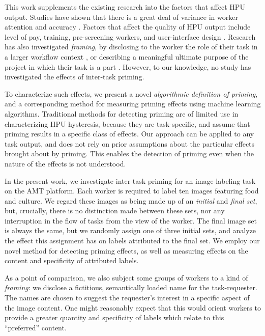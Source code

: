 \documentclass[a4paper]{report}
\begin{document}
This work supplements the existing research into the factors that affect HPU 
output.  Studies have shown that 
there is a great deal of variance in worker attention and 
accuracy \cite{kazai2013analysis}.
Factors that affect the quality of HPU 
output include level of pay\cite{kazai2013analysis}, 
training\cite{le2010ensuring}, pre-screening 
workers\cite{paolacci2010running}, and user-interface design
\cite{Finnerty2013}.  Research has also investigated \textit{framing}, 
by disclosing to the worker the role of
their task in a larger workflow context \cite{Kinnaird2012281}, 
or describing a meaningful ultimate purpose of the project in which their
task is a part \cite{chandler2013breaking}.  However, to our knowledge, no
study has investigated the effects of inter-task priming.

To characterize such effects, we present a novel  
\textit{algorithmic definition of priming}, and a corresponding method for
measuring priming effects using machine learning algorithms.  
Traditional methods for detecting priming are of limited use in characterizing 
HPU hysteresis, because they are task-specific, and assume that priming results
in a specific class of effects.
Our approach can be applied to any task output, and does not rely on prior 
assumptions about the particular effects brought about by priming.  This 
enables the detection of priming even when the nature of the effects is not 
understood.

In the present work, we investigate inter-task priming for an image-labeling 
task
on the AMT platform.  Each worker is required to label ten images featuring 
food and culture.  We regard these images as being made up of an 
\textit{initial} and \textit{final set}, but, crucially, there is no
distinction made between these sets, nor any interruption in the flow of tasks 
from the view of the worker.
The final image set is always the same, but we randomly assign one of three 
initial sets, and analyze the effect this assignment has on labels attributed 
to the final set.  We employ our novel method for detecting priming effects, as
well as measuring effects on the content and specificity of attributed labels. 

As a point of comparison, we also subject some groups of workers to a kind of
\textit{framing}: we disclose a fictitious, semantically loaded name for the 
task-requester.  The names are chosen to suggest the requester's interest in a 
specific aspect of the image content.  One might reasonably expect that this 
would orient workers to provide a greater quantity and specificity of labels 
which relate to this ``preferred'' content.
\end{document}
